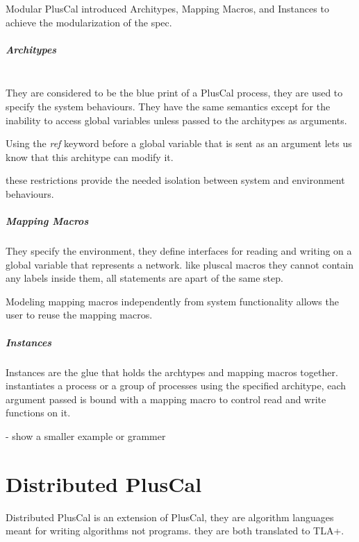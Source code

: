 \documentclass{thesul}
\begin{document}
Modular PlusCal introduced Architypes, Mapping Macros, and Instances to achieve the modularization of the spec.

\paragraph{\textbf{Architypes}}
\hfill\\
They are considered to be the blue print of a PlusCal process, they are used to specify the system behaviours. They have the same semantics except for the inability to access global variables unless passed to the architypes as arguments.

Using the \textit{ref} keyword before a global variable that is sent as an argument lets us know that this architype can modify it.

these restrictions provide the needed isolation between system and environment behaviours.

\paragraph{Mapping Macros}

They specify the environment, they define interfaces for reading and writing on a global variable that represents a network.
like pluscal macros they cannot contain any labels inside them, all statements are apart of the same step.

Modeling mapping macros independently from system functionality allows the user to reuse the mapping macros.

\paragraph{Instances}

Instances are the glue that holds the archtypes and mapping macros together.
instantiates a process or a group of processes using the specified architype, each argument passed is bound with a mapping macro to control read and write functions on it.

- show a smaller example or grammer

\chapter{Distributed PlusCal}

Distributed PlusCal is an extension of PlusCal, they are algorithm languages meant for writing algorithms not programs. they are both translated to TLA+. 
\end{document}
